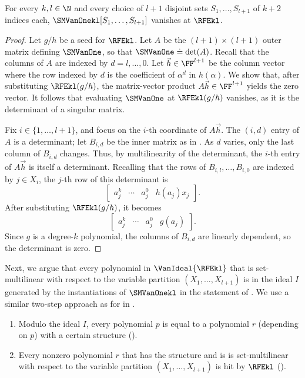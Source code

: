 \documentclass{toc}
\begin{document}
\begin{lemma}
  \label{lemma.smvanone-vanishes}
  For every \(k,l \in \N\) and every choice of \(l+1\) disjoint sets
  \(S_1,\dots,S_{l+1}\) of \(k+2\) indices each,
  \(\SMVanOnekl[S_1,\dots,S_{l+1}]\) vanishes at \(\RFEkl\).
\end{lemma}
\begin{proof}
  Let \(g/h\) be a seed for \(\RFEkl\).
  Let \(A\) be the \((l+1)\times(l+1)\) outer matrix defining
  \(\SMVanOne\), so that \(\SMVanOne \doteq \det(A)\).
  Recall that the columns of \(A\) are indexed by \(d=l,\ldots,0\).
  Let \(\vec{h}\in\FF^{l+1}\) be the column vector where the row indexed by
  \(d\) is the coefficient of \(\alpha^d\) in \(h(\alpha)\).
  We show that, after substituting \(\RFEkl(g/h)\),
  the matrix-vector product \(A\vec{h}\in \FF^{l+1}\) yields the zero
  vector.
  It follows that evaluating \(\SMVanOne\) at \(\RFEkl(g/h)\) vanishes,
  as it is the determinant of a singular matrix.

  Fix \(i\in\{1,\ldots,l+1\}\), and focus on the \(i\)-th coordinate of
  \(A\vec{h}\).
  The \((i,d)\) entry of \(A\) is a determinant;
  let \(B_{i,d}\) be the inner matrix as in .
  As \(d\) varies, only the last column of \(B_{i,d}\) changes.
  Thus, by multilinearity of the determinant,
  the \(i\)-th entry of \(A\vec{h}\) is itself a determinant.
  Recalling that the rows of \(B_{i,l},\ldots,B_{i,0}\) are indexed by
  \(j\in X_i\),
  the \(j\)-th row of this determinant is
  \[
    \begin{bmatrix}
      a_j^k & \cdots & a_j^0 & h(a_j) x_j 
    \end{bmatrix}.
  \]
  After substituting \(\RFEkl(g/h)\), it becomes
  \[
    \begin{bmatrix}
      a_j^k & \cdots & a_j^0 & g(a_j) 
    \end{bmatrix}.
  \]
  Since \(g\) is a degree-\(k\) polynomial,
  the columns of $B_{i,d}$ are linearly dependent,
  so the determinant is zero.
\end{proof}

Next, we argue that every polynomial in $\VanIdeal{\RFEkl}$ that is set-multilinear with respect to the variable partition $(X_1, \dots, X_{l+1})$ is in the ideal $I$ generated by the instantiations of $\SMVanOnekl$ in the statement of . We use a similar two-step approach as for 
 in .
\begin{enumerate}
  \item Modulo the ideal $I$, every polynomial $p$ is equal to a polynomial $r$ (depending on $p$) with a certain structure ().
  \item Every nonzero polynomial $r$ that has the structure and is is set-multilinear with respect to the variable partition $(X_1, \dots, X_{l+1})$ is hit by $\RFEkl$ ().
\end{enumerate}
\end{document}
